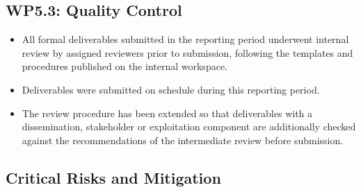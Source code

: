 \documentclass[a4paper,12pt, numbers]{article}
\begin{document}
\subsection{WP5.3: Quality Control}

\begin{itemize}[left=1em, itemsep=0pt, topsep=0pt]
	\item All formal deliverables submitted in the reporting period underwent internal review by assigned reviewers prior to submission, following the templates and procedures published on the internal workspace.
	\item Deliverables were submitted on schedule during this reporting period.
	\item The review procedure has been extended so that deliverables with a dissemination, stakeholder or exploitation component are additionally checked against the recommendations of the intermediate review before submission.
\end{itemize}

\subsection{Critical Risks and Mitigation}
\end{document}
